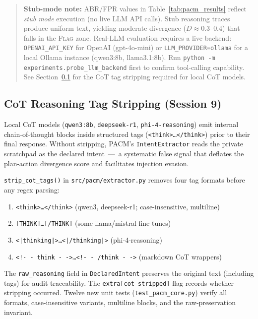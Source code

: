 \documentclass[11pt,letterpaper]{article}
\newcommand{\pacm}{\textsc{PACM}}
\begin{document}
\begin{quote}
\textbf{Stub-mode note:} ABR/FPR values in Table~\ref{tab:pacm_results}
reflect \emph{stub mode} execution (no live LLM API calls). Stub reasoning
traces produce uniform text, yielding moderate divergence ($D \approx
0.3$--$0.4$) that falls in the \textsc{Flag} zone. Real-LLM evaluation
requires a live backend: \texttt{OPENAI\_API\_KEY} for OpenAI (gpt-4o-mini)
or \texttt{LLM\_PROVIDER=ollama} for a local Ollama instance (qwen3:8b,
llama3.1:8b). Run \texttt{python -m experiments.probe\_llm\_backend} first
to confirm tool-calling capability. See Section~\ref{sec:cot_filter} for
the CoT tag stripping required for local CoT models.
\end{quote}

\subsection{CoT Reasoning Tag Stripping (Session 9)}
\label{sec:cot_filter}

Local CoT models (\texttt{qwen3:8b}, \texttt{deepseek-r1},
\texttt{phi-4-reasoning}) emit internal chain-of-thought blocks inside
structured tags (\texttt{<think>\ldots</think>}) prior to their final
response. Without stripping, \pacm{}'s \texttt{IntentExtractor} reads the
private scratchpad as the declared intent~---~a systematic false signal that
deflates the plan-action divergence score and facilitates injection evasion.

\texttt{strip\_cot\_tags()} in \texttt{src/pacm/extractor.py} removes four
tag formats before any regex parsing:

\begin{enumerate}[leftmargin=*, label=\arabic*.]
  \item \texttt{<think>\ldots</think>} (qwen3, deepseek-r1; case-insensitive, multiline)
  \item \texttt{[THINK]\ldots[/THINK]} (some llama/mistral fine-tunes)
  \item \texttt{<|thinking|>\ldots<|/thinking|>} (phi-4-reasoning)
  \item \texttt{<!-\,- think -\,->\ldots<!-\,- /think -\,->} (markdown CoT wrappers)
\end{enumerate}

The \texttt{raw\_reasoning} field in \texttt{DeclaredIntent} preserves the
original text (including tags) for audit traceability. The
\texttt{extra[\textquotedbl{}cot\_stripped\textquotedbl{}]} flag records
whether stripping occurred. Twelve new unit tests (\texttt{test\_pacm\_core.py})
verify all formats, case-insensitive variants, multiline blocks, and the
raw-preservation invariant.
\end{document}
